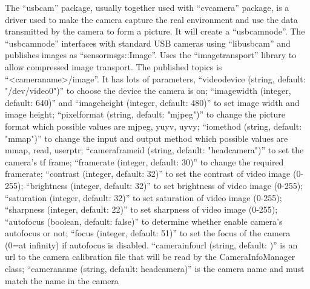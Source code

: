 \documentclass[10pt,twocolumn,letterpaper]{article}
\begin{document}
\begin{enumerate}
The “usb\underline{\hspace{0.5em}}cam” package, usually together used with “cv\underline{\hspace{0.5em}}camera” package, is a driver used to make the camera capture the real environment and use the data transmitted by the camera to form a picture. It will create a “usb\underline{\hspace{0.5em}}cam\underline{\hspace{0.5em}}node”. The “usb\underline{\hspace{0.5em}}cam\underline{\hspace{0.5em}}node” interfaces with standard USB cameras using “libusb\underline{\hspace{0.5em}}cam” and publishes images as “sensor\underline{\hspace{0.5em}}msgs::Image”. Uses the “image\underline{\hspace{0.5em}}transport” library to allow compressed image transport. The published topics is “<camera\underline{\hspace{0.5em}}name>/image”. It has lots of parameters, “video\underline{\hspace{0.5em}}device (string, default: "/dev/video0")” to choose the device the camera is on; “image\underline{\hspace{0.5em}}width (integer, default: 640)” and “image\underline{\hspace{0.5em}}height (integer, default: 480)” to set image width and image height; “pixel\underline{\hspace{0.5em}}format (string, default: "mjpeg")” to change the picture format which possible values are mjpeg, yuyv, uyvy; “io\underline{\hspace{0.5em}}method (string, default: "mmap")” to change the input and output method which possible values are mmap, read, userptr; “camera\underline{\hspace{0.5em}}frame\underline{\hspace{0.5em}}id (string, default: "head\underline{\hspace{0.5em}}camera")” to set the camera's tf frame; “framerate (integer, default: 30)” to change the required framerate; “contrast (integer, default: 32)” to set the contrast of video image (0-255); “brightness (integer, default: 32)” to set brightness of video image (0-255); “saturation (integer, default: 32)” to set saturation of video image (0-255); “sharpness (integer, default: 22)” to set sharpness of video image (0-255); “autofocus (boolean, default: false)” to determine whether enable camera's autofocus or not; “focus (integer, default: 51)” to set the focus of the camera (0=at infinity) if autofocus is disabled. “camera\underline{\hspace{0.5em}}info\underline{\hspace{0.5em}}url (string, default: )” is an url to the camera calibration file that will be read by the CameraInfoManager class; “camera\underline{\hspace{0.5em}}name (string, default: head\underline{\hspace{0.5em}}camera)” is the camera name and must match the name in the camera 
\end{enumerate}
\end{document}
